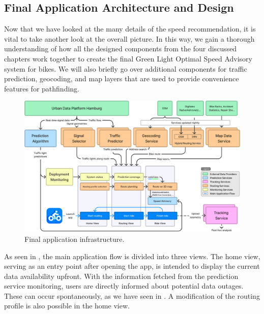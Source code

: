 \subsection{Final Application Architecture and Design}

Now that we have looked at the many details of the speed recommendation, it is vital to take another look at the overall picture. In this way, we gain a thorough understanding of how all the designed components from the four discussed chapters work together to create the final Green Light Optimal Speed Advisory system for bikes. We will also briefly go over additional components for traffic prediction, geocoding, and map layers that are used to provide convenience features for pathfinding.

\begin{figure}[t]
\caption{Final application infrastructure.}\label{fig:architecture}
\includegraphics[width=\linewidth]{images/architecture.png}
\end{figure}

As seen in , the main application flow is divided into three views. The home view, serving as an entry point after opening the app, is intended to display the current data availability upfront. With the information fetched from the prediction service monitoring, users are directly informed about potential data outages. These can occur spontaneously, as we have seen in . A modification of the routing profile is also possible in the home view.


